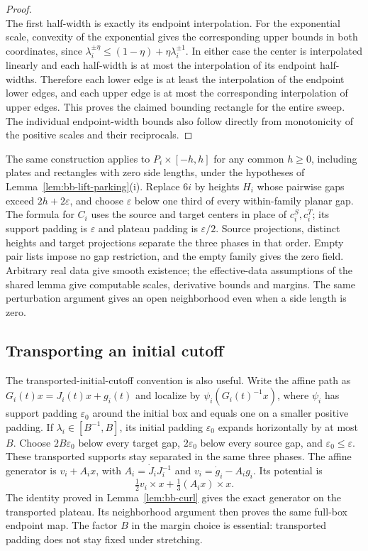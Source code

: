 \begin{proof}
\begin{equation}
\end{equation}
The first half-width is exactly its endpoint interpolation. For the
exponential scale, convexity of the exponential gives the corresponding
upper bounds in both coordinates, since
$\lambda_i^{\pm\eta}\le(1-\eta)+\eta\lambda_i^{\pm1}$.
In either case the center is interpolated linearly and each half-width
is at most the interpolation of its endpoint half-widths. Therefore each
lower edge is at least the interpolation of the endpoint lower edges,
and each upper edge is at most the corresponding interpolation of upper
edges. This proves the claimed bounding rectangle for the entire sweep.
The individual endpoint-width bounds also follow directly from monotonicity
of the positive scales and their reciprocals.
\end{proof}

The same construction applies to $P_i\times[-h,h]$ for any common
$h\ge0$, including plates and rectangles with zero side lengths, under
the hypotheses of Lemma~\ref{lem:bb-lift-parking}(i). Replace $6i$ by
heights $H_i$ whose pairwise gaps exceed $2h+2\varepsilon$, and choose
$\varepsilon$ below one third of every within-family planar gap. The
formula for $C_i$ uses the source and target centers in place of
$c_i^S,c_i^T$; its support padding is $\varepsilon$ and plateau padding
is $\varepsilon/2$. Source projections, distinct heights and target
projections separate the three phases in that order. Empty pair lists
impose no gap restriction, and the empty family gives the zero field.
Arbitrary real data give smooth existence; the effective-data assumptions
of the shared lemma give computable scales, derivative bounds and margins.
The same perturbation argument gives an open neighborhood even when a
side length is zero.

\subsection{Transporting an initial cutoff}
\label{sec:ba-transported-localization}

The transported-initial-cutoff convention is also useful.  Write the
affine path as $G_i(t)x=J_i(t)x+g_i(t)$ and localize by
$\psi_i(G_i(t)^{-1}x)$, where $\psi_i$ has support padding
$\varepsilon_0$ around the initial box and equals one on a smaller
positive padding.
If $\lambda_i\in[B^{-1},B]$, its initial padding
$\varepsilon_0$ expands horizontally by at most $B$.  Choose
$2B\varepsilon_0$ below every target gap,
$2\varepsilon_0$ below every source gap, and
$\varepsilon_0\le\varepsilon$.  These transported supports stay
separated in the same three phases.  The affine generator is
$v_i+A_ix$, with $A_i=\dot J_iJ_i^{-1}$ and
$v_i=\dot g_i-A_ig_i$.  Its potential is
\[
 \tfrac12v_i\times x+\tfrac13(A_ix)\times x.
\]
The identity proved in Lemma~\ref{lem:bb-curl} gives the exact
generator on the transported plateau.  Its neighborhood argument then
proves the same full-box endpoint map.  The factor $B$ in the margin
choice is essential: transported padding does not stay fixed under
stretching.

